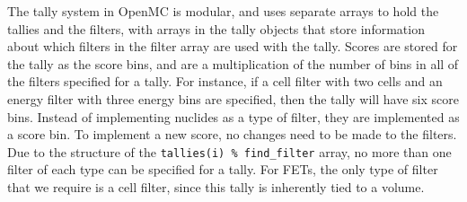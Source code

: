 \documentclass[10pt]{article}
\numberwithin{equation}{section} %
\begin{document}

The tally system in OpenMC is modular, and uses separate arrays to hold the tallies and the filters, with arrays in the tally objects that store information about which filters in the filter array are used with the tally. Scores are stored for the tally as the score bins, and are a multiplication of the number of bins in all of the filters specified for a tally. For instance, if a cell filter with two cells and an energy filter with three energy bins are specified, then the tally will have six score bins. Instead of implementing nuclides as a type of filter, they are implemented as a score bin. To implement a new score, no changes need to be made to the filters. Due to the structure of the {\tt tallies(i) \% find\_filter} array, no more than one filter of each type can be specified for a tally. For FETs, the only type of filter that we require is a cell filter, since this tally is inherently tied to a volume. 
\end{document}
